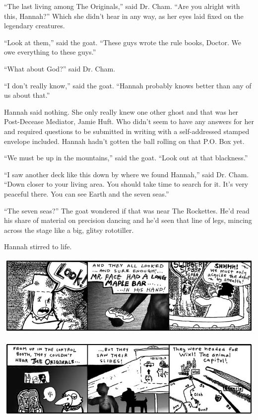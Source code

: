 \documentclass[10pt,twoside]{report}
\begin{document}
``The last living among The Originals,'' said Dr. Cham.  ``Are you
        alright with this, Hannah?''  Which she didn't hear in any
        way, as her eyes laid fixed on the legendary creatures.

``Look at them,'' said the goat.  ``These guys wrote the rule books,
        Doctor.  We owe everything to these guys.''

``What about God?'' said Dr. Cham.

``I don't really know,'' said the goat.  ``Hannah probably knows
        better than any of us about that.''

Hannah said nothing.  She only really knew one other ghost and that
was her Post-Decease Mediator, Jamie Huft.  Who didn't seem to have
any answers for her and required questions to be submitted in writing
with a self-addressed stamped envelope included.  Hannah hadn't gotten
the ball rolling on that P.O. Box yet.

``We must be up in the mountains,'' said the goat.  ``Look out at that
blackness.''

``I saw another deck like this down by where we found Hannah,'' said
Dr. Cham.  ``Down closer to your living area.  You should take time to
search for it.  It's very peaceful there. You can see Earth and the
seven seas.''

``The seven seas?''  The goat wondered if that was near The Rockettes.
He'd read his share of material on precision dancing and he'd seen
that line of legs, mincing across the stage like a big, glitsy
rototiller.

Hannah stirred to life.

	\includegraphics[width=1.0\textwidth]{cache/52.png}

	\includegraphics[width=1.0\textwidth]{cache/53.png}
\end{document}
